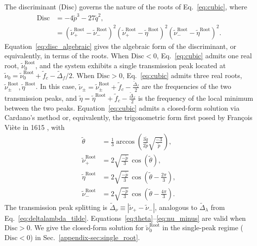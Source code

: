 \documentclass[%
  reprint,
  amsmath,amssymb,
  aps,
  prapplied,
  superscriptaddress,
  longbibliography]{revtex4-2}
\begin{document}
The discriminant ($\mathrm{Disc}$) governs the nature of the roots of Eq.~\ref{eq:cubic}, where
\begin{align} 
\mathrm{Disc} &= -4\tilde{p}^3 - 27 \tilde{q}^2, \label{eq:disc_algebraic}\\ &= (\tilde{\nu}_+^\text{Root} \!\!-\! \tilde{\nu}_-^\text{Root})^2 (\tilde{\nu}_+^\text{Root} \!\!-\!  \tilde{\eta}^\text{Root})^2 (\tilde{\nu}_-^\text{Root} \!\!-\!  \tilde{\eta}^\text{Root})^2. \nonumber
\end{align}
Equation~\ref{eq:disc_algebraic} gives the algebraic form of the discriminant, or equivalently, in terms of the roots. When $\mathrm{Disc} < 0$, Eq.~\ref{eq:cubic} admits one real root, $\tilde{\nu}_0^{\text{Root}}$, and the system exhibits a single transmission peak located at $\tilde{\nu}_0 = \tilde{\nu}_0^{\text{Root}}+\tilde{f}_c-\tilde{\Delta}_f/2$. When $\mathrm{Disc} > 0$, Eq.~\ref{eq:cubic} admits three real roots, $\tilde{\nu}_\pm^{\text{Root}}, \tilde{\eta}^{\text{Root}}$. In this case, $\tilde{\nu}_\pm = \tilde{\nu}_\pm^\text{Root} + \tilde{f}_c - \frac{\tilde{\Delta}_f}{2}$ are the frequencies of the two transmission peaks, and $\tilde{\eta} = \tilde{\eta}^\text{Root} + \tilde{f}_c - \frac{\tilde{\Delta}_f}{2}$ is the frequency of the local minimum between the two peaks. Equation~\ref{eq:cubic} admits a closed-form solution via Cardano's method or, equivalently, the trigonometric form first posed by Fran\c{c}ois Vi\`ete in 1615 \cite{nickalls_viete_2006, viete_ad_1615}, with
\begin{align}
    \tilde{\theta} &= \frac{1}{3}\arccos\!\left(
        \frac{3\tilde{q}}{2\tilde{p}}\sqrt{\frac{-3}{\tilde{p}}}
    \right), \label{eq:theta} \\
    \tilde{\nu}_+^\text{Root} &= 2\sqrt{\frac{-\tilde{p}}{3}}\,
        \cos\!\left(\tilde{\theta}\right), \label{eq:nu_plus} \\
    \tilde{\eta}^{\text{Root}} &= 2\sqrt{\frac{-\tilde{p}}{3}}\,
        \cos\!\left(\tilde{\theta} - \frac{2\pi}{3}\right), \label{eq:eta} \\
    \tilde{\nu}_-^{\text{Root}} &= 2\sqrt{\frac{-\tilde{p}}{3}}\,
        \cos\!\left(\tilde{\theta} - \frac{4\pi}{3}\right). \label{eq:nu_minus}
\end{align}
The transmission peak splitting is $\tilde{\Delta}_\nu \equiv |\tilde{\nu}_+ - \tilde{\nu}_-|$, analogous to $\tilde{\Delta}_\lambda$ from Eq.~\ref{eq:deltalambda_tilde}. Equations~\ref{eq:theta}--\ref{eq:nu_minus} are valid when $\mathrm{Disc} > 0$. We give the closed-form solution for $\tilde{\nu}_0^\text{Root}$ in the single-peak regime ($\mathrm{Disc} < 0$) in Sec.~\ref{appendix-sec:single_root}. 
\end{document}
